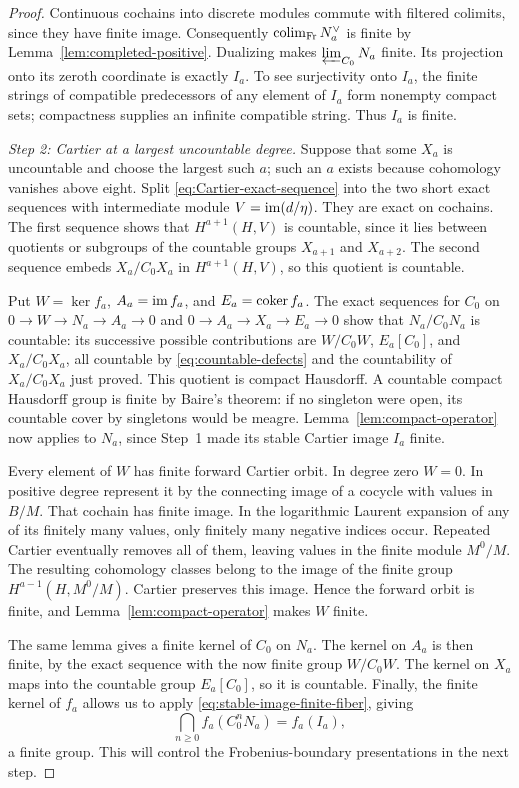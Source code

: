 \begin{proof}
Continuous cochains into discrete modules commute with filtered
colimits, since they have finite image.  Consequently
$\operatorname*{colim}_{\mathrm{Fr}}N_a^\vee$ is finite by
Lemma~\ref{lem:completed-positive}.  Dualizing makes
$\varprojlim_{C_0}N_a$ finite.  Its projection onto its zeroth
coordinate is exactly $I_a$.  To see surjectivity onto $I_a$,
the finite strings of compatible predecessors of any element of
$I_a$ form nonempty compact sets; compactness supplies an infinite
compatible string.  Thus $I_a$ is finite.

\smallskip\noindent\emph{Step 2: Cartier at a largest uncountable degree.}
Suppose that some $X_a$ is uncountable and
choose the largest such $a$; such an $a$
exists because cohomology vanishes above eight.  Split
\eqref{eq:Cartier-exact-sequence} into the two short exact
sequences with intermediate module $V=\operatorname{im}(d/\eta)$.
They are exact on cochains.  The first sequence shows that
$H^{a+1}(H,V)$ is countable, since it lies between quotients
or subgroups of the countable groups $X_{a+1}$ and $X_{a+2}$.
The second sequence embeds $X_a/C_0X_a$ in
$H^{a+1}(H,V)$, so this quotient is countable.

Put $W=\ker f_a$, $A_a=\operatorname{im} f_a$, and $E_a=\operatorname{coker} f_a$.
The exact sequences for $C_0$ on
$0\to W\to N_a\to A_a\to0$ and
$0\to A_a\to X_a\to E_a\to0$ show that
$N_a/C_0N_a$ is countable: its successive possible contributions
are $W/C_0W$, $E_a[C_0]$, and $X_a/C_0X_a$, all countable by
\eqref{eq:countable-defects} and the countability of $X_a/C_0X_a$ just proved.
This quotient is compact Hausdorff.  A countable compact
Hausdorff group is finite by Baire's theorem: if no singleton
were open, its countable cover by singletons would be meagre.
Lemma~\ref{lem:compact-operator} now applies to $N_a$, since
Step~1 made its stable Cartier image $I_a$ finite.

Every element of $W$ has finite forward Cartier orbit.  In degree
zero $W=0$.  In positive degree represent it by the connecting
image of a cocycle with values in $B/M$.  That cochain has finite
image.  In the logarithmic Laurent expansion of any of its
finitely many values, only finitely many negative indices occur.
Repeated Cartier eventually removes all of them, leaving values
in the finite module $M^0/M$.  The resulting cohomology classes
belong to the image of the finite group
$H^{a-1}(H,M^0/M)$.  Cartier preserves this image.  Hence the
forward orbit is finite, and Lemma~\ref{lem:compact-operator}
makes $W$ finite.

The same lemma gives a finite kernel of $C_0$ on $N_a$.
The kernel on $A_a$ is then finite, by the exact sequence with
the now finite group $W/C_0W$.  The kernel on $X_a$ maps into
the countable group $E_a[C_0]$, so it is countable.
Finally, the finite kernel of $f_a$ allows us to apply
\eqref{eq:stable-image-finite-fiber}, giving
\begin{equation}
 \label{eq:finite-stable-X-image}
 \bigcap_{n\ge0}f_a(C_0^nN_a)=f_a(I_a),
\end{equation}
a finite group.  This will control the Frobenius-boundary presentations
in the next step.


\end{proof}
